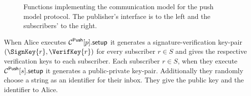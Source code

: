 \begin{figure}%
  \caption{%
    Functions implementing the communication model for the push model protocol.
    The publisher's interface is to the left and the subscribers' to the right.
  }\label{PushFunctions}
\end{figure}

When Alice executes \(\pnsetup{p}\) it generates a signature-verification 
key-pair \((\SignKey{r}, \VerifKey{r})\) for every subscriber \(r\in S\) and 
gives the respective verification keys to each subscriber.
Each subscriber \(r\in S\), when they execute \(\pnsetup{s}\) it generates 
a public-private key-pair.
Additionally they randomly choose a string as an identifier for their inbox.
They give the public key and the identifier to Alice.

